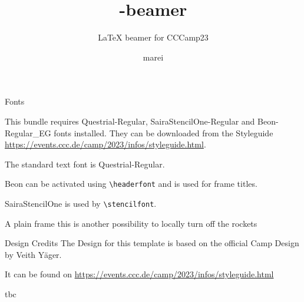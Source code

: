 \documentclass[aspectratio=169,t]{beamer}
\begin{document}
\title{-beamer}
\subtitle{\LaTeX{} beamer for CCCamp23}
\author{marei }

\maketitle
	
\begin{frame}[fragile]{Fonts}

This bundle requires Questrial-Regular, SairaStencilOne-Regular and Beon-Regular\_EG fonts installed. They can be downloaded from the Styleguide \url{https://events.ccc.de/camp/2023/infos/styleguide.html}.
	
The standard text font is Questrial-Regular.

Beon can be activated using \verb+\headerfont+ and is used for frame titles.

SairaStencilOne is used by \verb+\stencilfont+. 

\end{frame}

\begin{frame}[plain]{A plain frame}
this is another possibility to locally turn off the rockets
\end{frame}

\begin{frame}{Design Credits}
The Design for this template is based on the official Camp Design by Veith Yäger.

It can be found on \url{https://events.ccc.de/camp/2023/infos/styleguide.html}
\end{frame}

\begin{frame}
	tbc
\end{frame}
\end{document}
